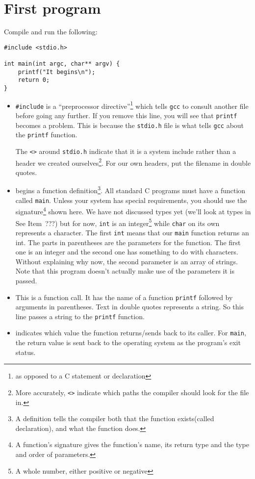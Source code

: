 
\chapter{First program}



Compile and run the following:
\begin{lstlisting}
#include <stdio.h>

int main(int argc, char** argv) {
    printf("It begins\n");
    return 0;
}
\end{lstlisting}

\begin{itemize}
 \item[1] \lstinline!#include! is a ``preprocessor directive''\footnote{as opposed to a C statement or declaration} which tells \texttt{gcc} to 
 consult another file before going any further.  If you remove this line, you will see that \texttt{printf} becomes a problem.
 This is because the \texttt{stdio.h} file is what tells \texttt{gcc} about the \texttt{printf} function.
 
 The \texttt{<>} around \texttt{stdio.h} indicate that it is a system include rather than a header we created ourselves\footnote{
 More accurately, \texttt{<>} indicate which paths the compiler should look for the file in.}.
 For our own headers, put the filename in double quotes.
 
 \item[3] begins a function definition\footnote{A definition tells the compiler both that the function exists(called declaration), and what the function does.}.
 All standard C programs must have a function called \texttt{main}.
 Unless your system has special requirements, you should use the signature\footnote{A function's signature gives the function's name, its return type and the type and order of parameters.} shown here.
 We have not discussed types yet (we'll look at types in See Item~???) but for now, \texttt{int} is an 
 integer\footnote{A whole number, either positive or negative} while \texttt{char} on its own represents a character.
 The first \texttt{int} means that our \texttt{main} function returns an int.
 The parts in parentheses are the parameters for the function.
 The first one is an integer and the second one has something to do with characters.
 Without explaining why now, the second parameter is an array of strings.
 Note that this program doesn't actually make use of the parameters it is passed.
 
 \item[4] This is a function call. It has the name of a function \texttt{printf} followed by arguments in parentheses.
 Text in double quotes represents a string. 
 So this line passes a string to the \texttt{printf} function.
 
 \item[5] indicates which value the function returns/sends back to its caller.
 For \texttt{main}, the return value is sent back to the operating system as the program's exit status.
\end{itemize}

